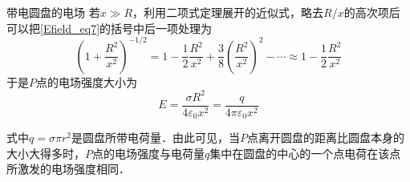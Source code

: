 \begin{example}{带电圆盘的电场}
若$x\gg R$，利用二项式定理展开的近似式，略去$R/x$的高次项后可以把\autoref{Efield_eq7}的括号中后一项处理为
\begin{equation}
\left(1+\frac{R^{2}}{x^{2}}\right)^{-1 / 2}=1-\frac{1}{2} \frac{R^{2}}{x^{2}}+\frac{3}{8}\left(\frac{R^{2}}{x^{2}}\right)^{2}-\cdots \approx 1-\frac{1}{2} \frac{R^{2}}{x^{2}}
\end{equation}
于是$P$点的电场强度大小为
\begin{equation}
E=\frac{\sigma R^{2}}{4 \varepsilon_{0} x^{2}} =\frac{q}{4 \pi \varepsilon_{0} x^{2}} 
\end{equation}

式中$q=\sigma\pi r^2$是圆盘所带电荷量．由此可见，当$P$点离开圆盘的距离比圆盘本身的大小大得多时，$ P$点的电场强度与电荷量$q$集中在圆盘的中心的一个点电荷在该点所激发的电场强度相同．
\end{example}
